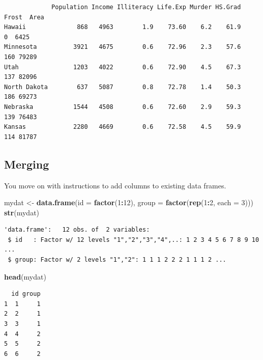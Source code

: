 \documentclass[
]{book}
\newenvironment{Shaded}{\begin{snugshade}}{\end{snugshade}}
\newcommand{\DataTypeTok}[1]{\textcolor[rgb]{0.13,0.29,0.53}{#1}}
\newcommand{\DecValTok}[1]{\textcolor[rgb]{0.00,0.00,0.81}{#1}}
\newcommand{\KeywordTok}[1]{\textcolor[rgb]{0.13,0.29,0.53}{\textbf{#1}}}
\newcommand{\NormalTok}[1]{#1}
\newcommand{\OperatorTok}[1]{\textcolor[rgb]{0.81,0.36,0.00}{\textbf{#1}}}
\newcommand{\StringTok}[1]{\textcolor[rgb]{0.31,0.60,0.02}{#1}}
\begin{document}
\begin{verbatim}
             Population Income Illiteracy Life.Exp Murder HS.Grad Frost  Area
Hawaii              868   4963        1.9    73.60    6.2    61.9     0  6425
Minnesota          3921   4675        0.6    72.96    2.3    57.6   160 79289
Utah               1203   4022        0.6    72.90    4.5    67.3   137 82096
North Dakota        637   5087        0.8    72.78    1.4    50.3   186 69273
Nebraska           1544   4508        0.6    72.60    2.9    59.3   139 76483
Kansas             2280   4669        0.6    72.58    4.5    59.9   114 81787
\end{verbatim}

\hypertarget{merging}{%
\subsection{Merging}\label{merging}}

You move on with instructions to add columns to existing data frames.

\begin{Shaded}
\begin{Highlighting}[]
\NormalTok{mydat <-}\StringTok{ }\KeywordTok{data.frame}\NormalTok{(}\DataTypeTok{id =} \KeywordTok{factor}\NormalTok{(}\DecValTok{1}\OperatorTok{:}\DecValTok{12}\NormalTok{), }
                    \DataTypeTok{group =} \KeywordTok{factor}\NormalTok{(}\KeywordTok{rep}\NormalTok{(}\DecValTok{1}\OperatorTok{:}\DecValTok{2}\NormalTok{, }\DataTypeTok{each =} \DecValTok{3}\NormalTok{)))}
\KeywordTok{str}\NormalTok{(mydat)}
\end{Highlighting}
\end{Shaded}

\begin{verbatim}
'data.frame':	12 obs. of  2 variables:
 $ id   : Factor w/ 12 levels "1","2","3","4",..: 1 2 3 4 5 6 7 8 9 10 ...
 $ group: Factor w/ 2 levels "1","2": 1 1 1 2 2 2 1 1 1 2 ...
\end{verbatim}

\begin{Shaded}
\begin{Highlighting}[]
\KeywordTok{head}\NormalTok{(mydat)}
\end{Highlighting}
\end{Shaded}

\begin{verbatim}
  id group
1  1     1
2  2     1
3  3     1
4  4     2
5  5     2
6  6     2
\end{verbatim}
\end{document}
